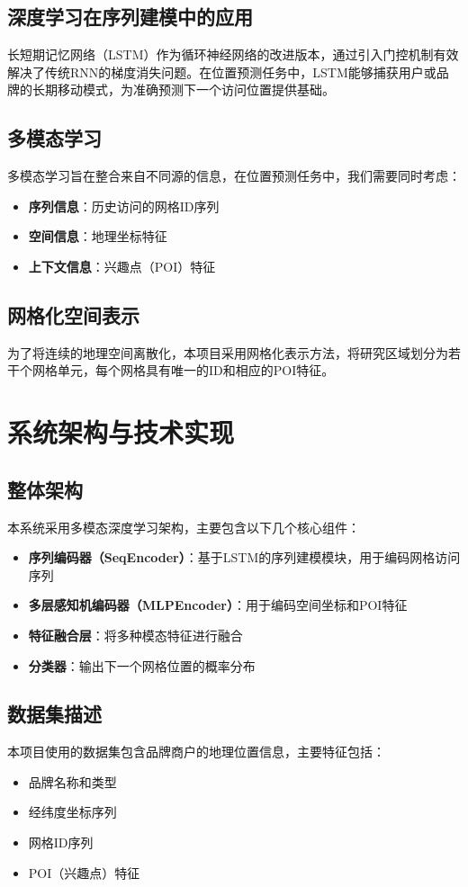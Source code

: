 \documentclass{article}
\begin{document}
\subsection{深度学习在序列建模中的应用}
长短期记忆网络（LSTM）作为循环神经网络的改进版本，通过引入门控机制有效解决了传统RNN的梯度消失问题。在位置预测任务中，LSTM能够捕获用户或品牌的长期移动模式，为准确预测下一个访问位置提供基础。

\subsection{多模态学习}
多模态学习旨在整合来自不同源的信息，在位置预测任务中，我们需要同时考虑：
\begin{itemize}
    \item \textbf{序列信息}：历史访问的网格ID序列
    \item \textbf{空间信息}：地理坐标特征
    \item \textbf{上下文信息}：兴趣点（POI）特征
\end{itemize}

\subsection{网格化空间表示}
为了将连续的地理空间离散化，本项目采用网格化表示方法，将研究区域划分为若干个网格单元，每个网格具有唯一的ID和相应的POI特征。

\section{系统架构与技术实现}

\subsection{整体架构}
本系统采用多模态深度学习架构，主要包含以下几个核心组件：
\begin{itemize}
    \item \textbf{序列编码器（SeqEncoder）}：基于LSTM的序列建模模块，用于编码网格访问序列
    \item \textbf{多层感知机编码器（MLPEncoder）}：用于编码空间坐标和POI特征
    \item \textbf{特征融合层}：将多种模态特征进行融合
    \item \textbf{分类器}：输出下一个网格位置的概率分布
\end{itemize}

\subsection{数据集描述}
本项目使用的数据集包含品牌商户的地理位置信息，主要特征包括：
\begin{itemize}
    \item 品牌名称和类型
    \item 经纬度坐标序列
    \item 网格ID序列
    \item POI（兴趣点）特征
\end{itemize}
\end{document}
